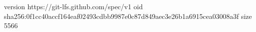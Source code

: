 version https://git-lfs.github.com/spec/v1
oid sha256:0f1cc40accf164eaf02493cdbb9987e0c87d849aec3e26b1a6915cea03008a3f
size 5566
